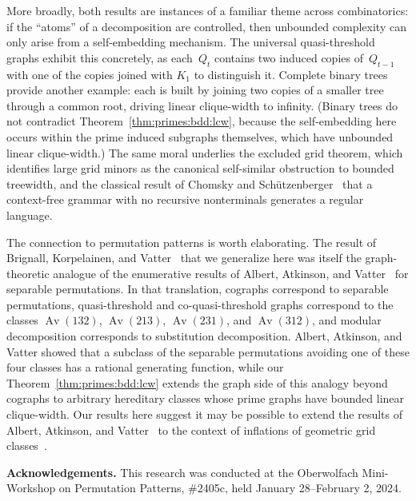 \documentclass[10pt]{article}
\newcommand{\minisec}[1]{\medskip\noindent\textbf{#1.}}
\newcommand{\Av}{\operatorname{Av}}
\theoremstyle{plain}
\begin{document}
More broadly, both results are instances of a familiar theme across combinatorics: if the ``atoms'' of a decomposition are controlled, then unbounded complexity can only arise from a self-embedding mechanism. The universal quasi-threshold graphs exhibit this concretely, as each~$Q_t$ contains two induced copies of~$Q_{t-1}$ with one of the copies joined with $K_1$ to distinguish it. Complete binary trees provide another example: each is built by joining two copies of a smaller tree through a common root, driving linear clique-width to infinity. (Binary trees do not contradict Theorem~\ref{thm:primes:bdd:lcw}, because the self-embedding here occurs within the prime induced subgraphs themselves, which have unbounded linear clique-width.) The same moral underlies the excluded grid theorem, which identifies large grid minors as the canonical self-similar obstruction to bounded treewidth, and the classical result of Chomsky and Sch\"utzenberger~\cite{chomsky:the-algebraic-t:} that a context-free grammar with no recursive nonterminals generates a regular language.

The connection to permutation patterns is worth elaborating. The result of Brignall, Korpelainen, and Vatter~\cite{brignall:linear-clique-w:} that we generalize here was itself the graph-theoretic analogue of the enumerative results of Albert, Atkinson, and Vatter~\cite{albert:subclasses-of-t:} for separable permutations. In that translation, cographs correspond to separable permutations, quasi-threshold and co-quasi-threshold graphs correspond to the classes $\Av(132)$, $\Av(213)$, $\Av(231)$, and $\Av(312)$, and modular decomposition corresponds to substitution decomposition. Albert, Atkinson, and Vatter showed that a subclass of the separable permutations avoiding one of these four classes has a rational generating function, while our Theorem~\ref{thm:primes:bdd:lcw} extends the graph side of this analogy beyond cographs to arbitrary hereditary classes whose prime graphs have bounded linear clique-width. Our results here suggest it may be possible to extend the results of Albert, Atkinson, and Vatter~\cite{albert:subclasses-of-t:} to the context of inflations of geometric grid classes~\cite{albert:inflations-of-g:,albert:geometric-grid-:}.

%
%
%
%
%
%
%
%
%
%
%
%
%
%
%
%
%
%
%
%

\minisec{Acknowledgements}
This research was conducted at the Oberwolfach Mini-Workshop on Permutation Patterns, \#2405c, held January 28--February 2, 2024.

%
%
%

\setlength{\bibsep}{4pt}

%
%
%



\end{document}
